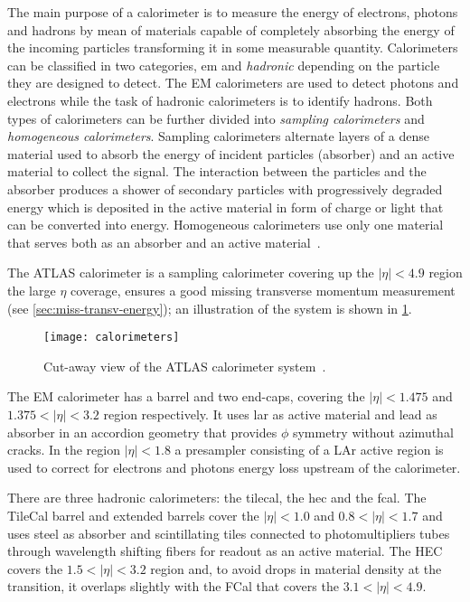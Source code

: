 The main purpose of a calorimeter is to measure the energy of electrons, photons
and hadrons by mean of materials capable of completely absorbing the energy of
the incoming particles transforming it in some measurable quantity. Calorimeters
can be classified in two categories, \gls{em} and \emph{hadronic} depending on
the particle they are designed to detect. The EM calorimeters are used to detect
photons and electrons while the task of hadronic calorimeters is to identify
hadrons. Both types of calorimeters can be further divided into \emph{sampling
  calorimeters} and \emph{homogeneous calorimeters}. Sampling calorimeters
alternate layers of a dense material used to absorb the energy of incident
particles (absorber) and an active material to collect the signal. The
interaction between the particles and the absorber produces a shower of
secondary particles with progressively degraded energy which is deposited in the
active material in form of charge or light that can be converted into
energy. Homogeneous calorimeters use only one material that serves both as an
absorber and an active material~\cite{Calorimetry}.

The ATLAS calorimeter is a sampling calorimeter covering up the $|\eta| < 4.9$
region the large $\eta$ coverage, ensures a good missing transverse momentum
measurement (see \cref{sec:miss-transv-energy}); an illustration of the system
is shown in \cref{fig:calo}.
\begin{figure}[!htb]
  \centering
    \texttt{[image: calorimeters]}
    \caption{Cut-away view of the ATLAS calorimeter system~\cite{ATLASPaper}.}
    \label{fig:calo}
\end{figure}

The EM calorimeter has a barrel and two end-caps, covering the $|\eta| < 1.475$
and $1.375 < |\eta| < 3.2$ region respectively. It uses \gls{lar} as active
material and lead as absorber in an accordion geometry that provides $\phi$
symmetry without azimuthal cracks. In the region $|\eta| < 1.8$ a presampler
consisting of a LAr active region is used to correct for electrons and photons
energy loss upstream of the calorimeter.

There are three hadronic calorimeters: the \gls{tilecal}, the \gls{hec} and the
\gls{fcal}. The TileCal barrel and extended barrels cover the $|\eta| < 1.0$ and
$0.8 < |\eta| < 1.7$ and uses steel as absorber and scintillating tiles
connected to photomultipliers tubes through wavelength shifting fibers for
readout as an active material. The HEC covers the $1.5 < |\eta| < 3.2$ region
and, to avoid drops in material density at the transition, it overlaps slightly
with the FCal that covers the $3.1 < |\eta| < 4.9$.
